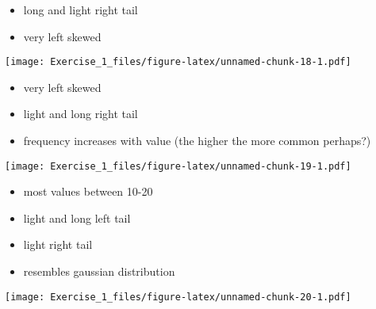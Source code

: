 \documentclass[]{article}
\newenvironment{Shaded}{\begin{snugshade}}{\end{snugshade}}
\newcommand{\CommentTok}[1]{\textcolor[rgb]{0.56,0.35,0.01}{\textit{#1}}}
\newcommand{\KeywordTok}[1]{\textcolor[rgb]{0.13,0.29,0.53}{\textbf{#1}}}
\newcommand{\NormalTok}[1]{#1}
\newcommand{\OperatorTok}[1]{\textcolor[rgb]{0.81,0.36,0.00}{\textbf{#1}}}
\providecommand{\tightlist}{%
  \setlength{\itemsep}{0pt}\setlength{\parskip}{0pt}}
\begin{document}
\begin{itemize}
\tightlist
\item
  long and light right tail
\item
  very left skewed
\end{itemize}

\begin{Shaded}
\end{Shaded}

\texttt{[image: Exercise\_1\_files/figure-latex/unnamed-chunk-18-1.pdf]}

\begin{itemize}
\tightlist
\item
  very left skewed
\item
  light and long right tail
\item
  frequency increases with value (the higher the more common perhaps?)
\end{itemize}

\begin{Shaded}
\end{Shaded}

\texttt{[image: Exercise\_1\_files/figure-latex/unnamed-chunk-19-1.pdf]}

\begin{itemize}
\tightlist
\item
  most values between 10-20
\item
  light and long left tail
\item
  light right tail
\item
  resembles gaussian distribution
\end{itemize}

\begin{Shaded}
\end{Shaded}

\texttt{[image: Exercise\_1\_files/figure-latex/unnamed-chunk-20-1.pdf]}
\end{document}
